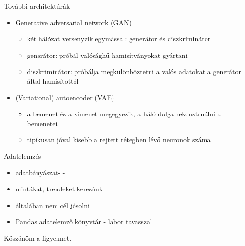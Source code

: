 \documentclass[bigger]{beamer}
\begin{document}
\begin{frame}{További architektúrák}
    \begin{itemize}
        \item Generative adversarial network (GAN)
            \begin{itemize}
                \item két hálózat versenyzik egymással: generátor és diszkriminátor
                \item generátor: próbál valósághű hamisítványokat gyártani
                \item diszkriminátor: próbálja megkülönböztetni a valós adatokat a generátor által hamisítottól
            \end{itemize}
        \item (Variational) autoencoder (VAE)
            \begin{itemize}
                \item a bemenet és a kimenet megegyezik, a háló dolga rekonstruálni a bemenetet
                \item tipikusan jóval kisebb a rejtett rétegben lévő neuronok száma
            \end{itemize}
    \end{itemize}
\end{frame}

\begin{frame}{Adatelemzés}
    \begin{itemize}
        \item adatbányászat- -
        \item mintákat, trendeket keresünk
        \item általában nem cél jósolni
        \item Pandas adatelemző könyvtár - labor tavasszal
    \end{itemize}
\end{frame}

\begin{frame}{Köszönöm a figyelmet.}



\end{frame}
\end{document}
